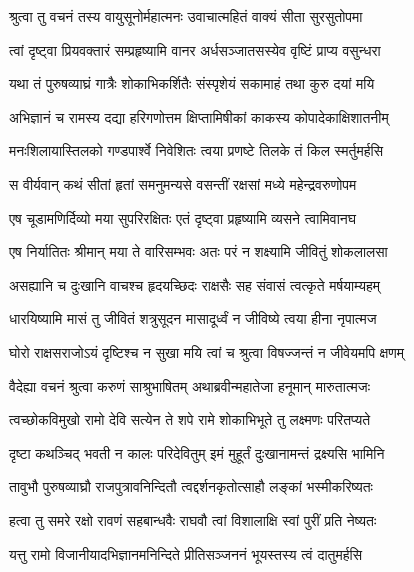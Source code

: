 
\twolineshloka
{श्रुत्वा तु वचनं तस्य वायुसूनोर्महात्मनः}
{उवाचात्महितं वाक्यं सीता सुरसुतोपमा} %

\twolineshloka
{त्वां दृष्ट्वा प्रियवक्तारं सम्प्रहृष्यामि वानर}
{अर्धसञ्जातसस्येव वृष्टिं प्राप्य वसुन्धरा} %

\twolineshloka
{यथा तं पुरुषव्याघ्रं गात्रैः शोकाभिकर्शितैः}
{संस्पृशेयं सकामाहं तथा कुरु दयां मयि} %

\twolineshloka
{अभिज्ञानं च रामस्य दद्या हरिगणोत्तम}
{क्षिप्तामिषीकां काकस्य कोपादेकाक्षिशातनीम्} %

\twolineshloka
{मनःशिलायास्तिलको गण्डपार्श्वे निवेशितः}
{त्वया प्रणष्टे तिलके तं किल स्मर्तुमर्हसि} %

\twolineshloka
{स वीर्यवान् कथं सीतां हृतां समनुमन्यसे}
{वसन्तीं रक्षसां मध्ये महेन्द्रवरुणोपम} %

\twolineshloka
{एष चूडामणिर्दिव्यो मया सुपरिरक्षितः}
{एतं दृष्ट्वा प्रहृष्यामि व्यसने त्वामिवानघ} %

\twolineshloka
{एष निर्यातितः श्रीमान् मया ते वारिसम्भवः}
{अतः परं न शक्ष्यामि जीवितुं शोकलालसा} %

\twolineshloka
{असह्यानि च दुःखानि वाचश्च हृदयच्छिदः}
{राक्षसैः सह संवासं त्वत्कृते मर्षयाम्यहम्} %

\twolineshloka
{धारयिष्यामि मासं तु जीवितं शत्रुसूदन}
{मासादूर्ध्वं न जीविष्ये त्वया हीना नृपात्मज} %

\twolineshloka
{घोरो राक्षसराजोऽयं दृष्टिश्च न सुखा मयि}
{त्वां च श्रुत्वा विषज्जन्तं न जीवेयमपि क्षणम्} %

\twolineshloka
{वैदेह्या वचनं श्रुत्वा करुणं साश्रुभाषितम्}
{अथाब्रवीन्महातेजा हनूमान् मारुतात्मजः} %

\twolineshloka
{त्वच्छोकविमुखो रामो देवि सत्येन ते शपे}
{रामे शोकाभिभूते तु लक्ष्मणः परितप्यते} %

\twolineshloka
{दृष्टा कथञ्चिद् भवती न कालः परिदेवितुम्}
{इमं मुहूर्तं दुःखानामन्तं द्रक्ष्यसि भामिनि} %

\twolineshloka
{तावुभौ पुरुषव्याघ्रौ राजपुत्रावनिन्दितौ}
{त्वद्दर्शनकृतोत्साहौ लङ्कां भस्मीकरिष्यतः} %

\twolineshloka
{हत्वा तु समरे रक्षो रावणं सहबान्धवैः}
{राघवौ त्वां विशालाक्षि स्वां पुरीं प्रति नेष्यतः} %

\twolineshloka
{यत्तु रामो विजानीयादभिज्ञानमनिन्दिते}
{प्रीतिसञ्जननं भूयस्तस्य त्वं दातुमर्हसि} %

